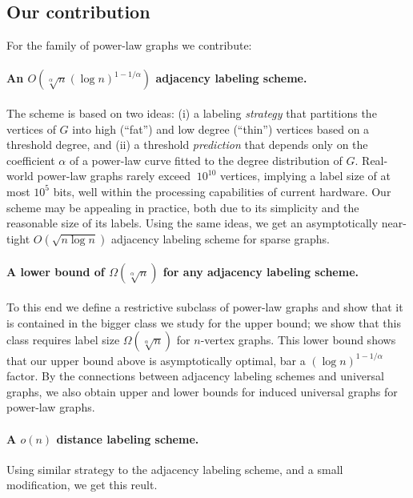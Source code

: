 \subsection{Our contribution}
For the family of power-law graphs we contribute:
\paragraph{An  $O(\sqrt[\alpha] n (\log n)^{1 - 1/\alpha})$ adjacency labeling scheme.}
The scheme is based on two ideas:
(i) a labeling \emph{strategy} that  partitions the vertices of $G$ into high (``fat'') and low degree (``thin'') vertices based on a threshold degree, and (ii) a threshold \emph{prediction} that depends only on the coefficient $\alpha$ of a power-law curve fitted to the degree distribution of $G$. 
Real-world power-law graphs rarely exceed  $~10^{10}$ vertices, implying a label size of at most  ${10^{5}}$ bits, well within the processing capabilities of current hardware. 
Our  scheme may be appealing in practice,  both due  to its simplicity and the reasonable size of its labels.
Using the same ideas, we get an  asymptotically near-tight  $O(\sqrt{n \log n})$ adjacency labeling scheme for sparse graphs.

\paragraph{A lower bound of $\Omega(\sqrt[\alpha]{n})$ for any adjacency labeling scheme.}
To this end we define a  restrictive subclass of power-law graphs and show that it is contained in the bigger class we study for the upper bound; we show that this class requires label size $\Omega(\sqrt[\alpha]{n})$ for $n$-vertex graphs.
This lower bound shows that our upper bound above is asymptotically  optimal, bar a $(\log n)^{1 - 1/\alpha}$ factor.
By the connections between adjacency labeling schemes and universal graphs, we also obtain upper and lower bounds for induced universal graphs for power-law graphs. 

\paragraph{A  $o(n)$ distance labeling scheme.}
Using similar strategy to the adjacency labeling scheme, and a small modification, we get this reult.


